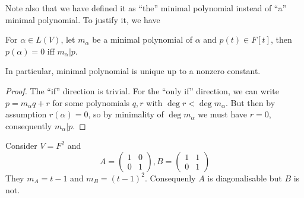 Note also that we have defined it as ``the'' minimal polynomial instead of ``a'' minimal polynomial.
To justify it, we have
\begin{lemma}
    For $\alpha\in L(V)$, let $m_\alpha$ be a minimal polynomial of $\alpha$ and $p(t)\in F[t]$, then $p(\alpha)=0$ iff $m_\alpha|p$.
\end{lemma}
In particular, minimal polynomial is unique up to a nonzero constant.
\begin{proof}
    The ``if'' direction is trivial.
    For the ``only if'' direction, we can write $p=m_\alpha q+r$ for some polynomials $q,r$ with $\deg r<\deg m_\alpha$.
    But then by assumption $r(\alpha)=0$, so by minimality of $\deg m_\alpha$ we must have $r=0$, consequently $m_\alpha|p$.
\end{proof}
\begin{example}
    Consider $V=F^2$ and
    $$A=\begin{pmatrix}
        1&0\\
        0&1
    \end{pmatrix},B=\begin{pmatrix}
        1&1\\
        0&1
    \end{pmatrix}$$
    They $m_A=t-1$ and $m_B=(t-1)^2$.
    Consequenly $A$ is diagonalisable but $B$ is not.
\end{example}